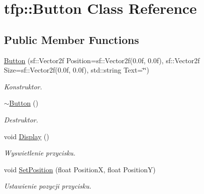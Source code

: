 \hypertarget{classtfp_1_1_button}{}\section{tfp\+:\+:Button Class Reference}
\label{classtfp_1_1_button}
\subsection*{Public Member Functions}
\begin{DoxyCompactItemize}
\item 
\mbox{\label{classtfp_1_1_button_ab0b32e85a6c970f104efa34ec722fe1b}} 
\mbox{\hyperlink{classtfp_1_1_button_ab0b32e85a6c970f104efa34ec722fe1b}{Button}} (sf\+::\+Vector2f Position=sf\+::\+Vector2f(0.\+0f, 0.\+0f), sf\+::\+Vector2f Size=sf\+::\+Vector2f(0.\+0f, 0.\+0f), std\+::string Text=\char`\"{}\char`\"{})
\begin{DoxyCompactList}\small\item\em Konstruktor. \end{DoxyCompactList}\item 
\mbox{\label{classtfp_1_1_button_ac1c0edee3421e233e8381b22835d88bf}} 
\mbox{\hyperlink{classtfp_1_1_button_ac1c0edee3421e233e8381b22835d88bf}{$\sim$\+Button}} ()
\begin{DoxyCompactList}\small\item\em Destruktor. \end{DoxyCompactList}\item 
void \mbox{\hyperlink{classtfp_1_1_button_a6d939faf2c819275923bc088e371767f}{Display}} ()
\begin{DoxyCompactList}\small\item\em Wyswietlenie przycisku. \end{DoxyCompactList}\item 
\mbox{\label{classtfp_1_1_button_a562099868b6a1a30399c22ff67560fa5}} 
void \mbox{\hyperlink{classtfp_1_1_button_a562099868b6a1a30399c22ff67560fa5}{Set\+Position}} (float PositionX, float PositionY)
\begin{DoxyCompactList}\small\item\em Ustawienie pozycji przycisku. \end{DoxyCompactList}\item 
\mbox{\label{classtfp_1_1_button_a3aac1fa8da8f084fb1b845f5f4ea1ae0}} 

\end{DoxyCompactItemize}
